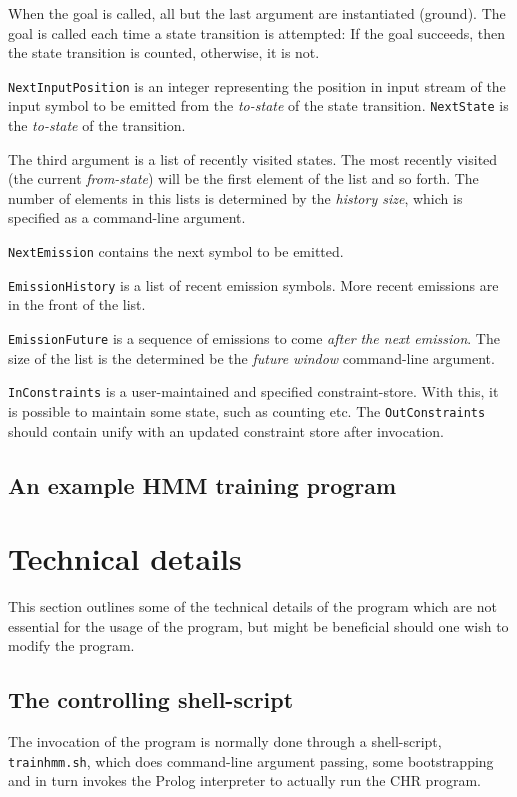 \documentclass{article}
\begin{document}
When the goal is called, all but the last argument are instantiated (ground). The goal is called each time a state transition is attempted: If the goal succeeds, 
then the state transition is counted, otherwise, it is not.

\texttt{NextInputPosition} is an integer representing the position in input stream of the input symbol to be emitted from the \emph{to-state} of the state transition.
\texttt{NextState} is the \emph{to-state} of the transition. 

The third argument is a list of recently visited states. The most recently visited (the current \emph{from-state}) will be the first element of the list and so forth. The
number of elements in this lists is determined by the \emph{history size}, which is specified as a command-line argument.

\texttt{NextEmission} contains the next symbol to be emitted.

\texttt{EmissionHistory} is a list of recent emission symbols. More recent emissions are in the front of the list. 

\texttt{EmissionFuture} is a sequence of emissions to come \emph{after the next emission}. The size of the list is the determined be the \emph{future window} 
command-line argument.

\texttt{InConstraints} is a user-maintained and specified constraint-store. With this, it is possible to maintain some state, such as counting etc. The \texttt{OutConstraints} 
should contain unify with an updated constraint store after invocation.

\subsection{An example HMM training program}

\section{Technical details}

This section outlines some of the technical details of the program which are not essential for 
the usage of the program, but might be beneficial should one wish to modify the program.

\subsection{The controlling shell-script}

The invocation of the program is normally done through a shell-script, \texttt{trainhmm.sh}, which does command-line argument passing,
some bootstrapping and in turn invokes the Prolog interpreter to actually run the CHR program.
\end{document}
